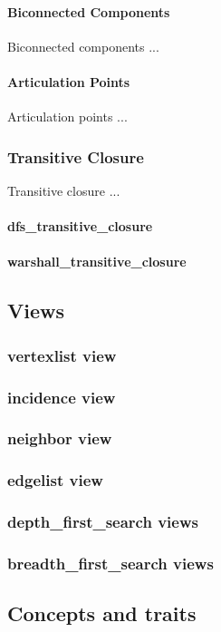 \documentclass[10pt,onecolumn]{article}
\begin{document}
\paragraph{Biconnected Components}
Biconnected components \cite{REF_} ...

\paragraph{Articulation Points}
Articulation points \cite{REF_} ...

\subsubsection{Transitive Closure}
Transitive closure \cite{REF_} ...
\paragraph{dfs\_transitive\_closure}
\paragraph{warshall\_transitive\_closure}

\subsection{Views}
\subsubsection{vertexlist view}
\subsubsection{incidence view}
\subsubsection{neighbor view}
\subsubsection{edgelist view}
\subsubsection{depth\_first\_search views}
\subsubsection{breadth\_first\_search views}
\subsection{Concepts and traits}
\end{document}
